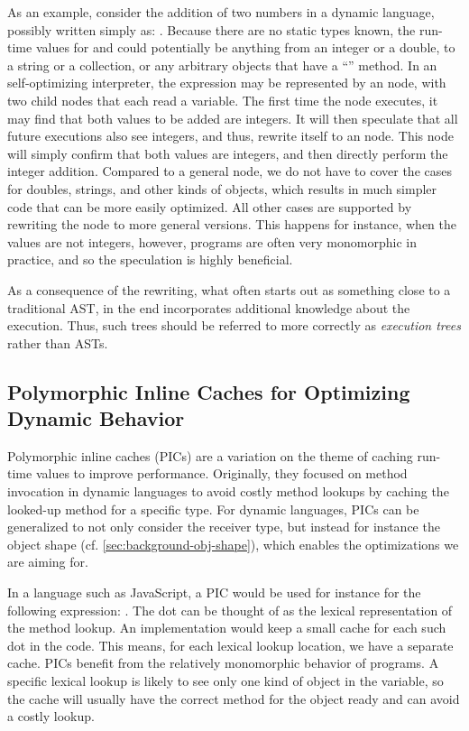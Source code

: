 As an example, consider the addition of two numbers in a dynamic language,
possibly written simply as: .
Because there are no static types known,
the run-time values for  and  could potentially be anything
from an integer or a double, to a string or a collection, or any
arbitrary objects that have a ``\code{+}'' method.
In an self-optimizing interpreter, the expression may be represented by
an  node, with two child nodes that each read a variable.
The first time the  node executes,
it may find that both values to be added are integers.
It will then speculate that all future executions
also see integers, and thus, rewrite itself to an  node.
This  node will simply confirm that both values are integers,
and then directly perform the integer addition.
Compared to a general  node,
we do not have to cover the cases for doubles, strings, and other kinds of objects,
which results in much simpler code that can be more easily optimized.
All other cases are supported by rewriting the  node to more general
versions.
This happens for instance, when the values are not integers, 
however, programs are often very monomorphic in practice, and
so the speculation is highly beneficial.

As a consequence of the rewriting,
what often starts out as something close to a traditional AST,
in the end incorporates additional knowledge about the execution.
Thus, such trees should be referred to more correctly as
\emph{execution trees} rather than ASTs.


\subsection{Polymorphic Inline Caches for Optimizing Dynamic Behavior}
\label{sec:background-pics}

Polymorphic inline caches (PICs)\citep{Hoelzle:91:PIC}
are a variation on the theme of caching run-time values to improve performance.
Originally, they focused on method invocation in dynamic languages
to avoid costly method lookups by
caching the looked-up method for a specific type.
%
For dynamic languages,
PICs can be generalized to not only consider the receiver type,
but instead for instance the object shape (cf. \cref{sec:background-obj-shape}),
which enables the optimizations we are aiming for.

In a language such as JavaScript,
a PIC would be used for instance for the following expression:
.
The dot can be thought of as the lexical representation of the method lookup.
An implementation would keep a small cache for each such dot in the code.
This means, for each lexical lookup location, we have a separate cache.
PICs benefit from the relatively monomorphic behavior of programs.
A specific lexical lookup is likely to see only one kind of
object in the  variable, so the cache will usually have the
correct method for the object ready 
and can avoid a costly lookup.


